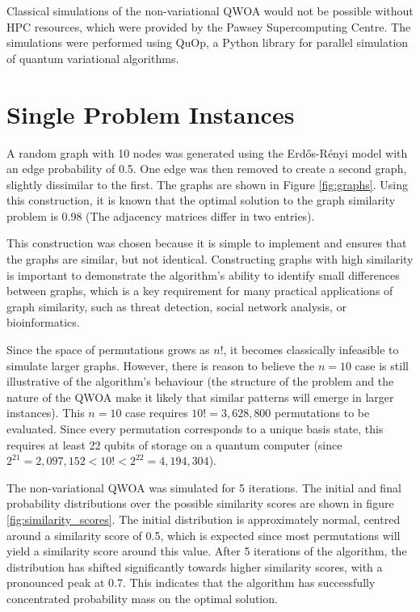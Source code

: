 Classical simulations of the non-variational QWOA would not be possible without HPC resources, which were provided by the Pawsey Supercomputing Centre. The simulations were performed using QuOp, a Python library for parallel simulation of quantum variational algorithms. \cite{QuOp_MPI_paper_variational,QuOp_MPI}

\section{Single Problem Instances}

A random graph with 10 nodes was generated using the Erdős-Rényi model with an edge probability of 0.5. One edge was then removed to create a second graph, slightly dissimilar to the first. The graphs are shown in Figure \ref{fig:graphs}. Using this construction, it is known that the optimal solution to the graph similarity problem is 0.98 (The adjacency matrices differ in two entries).

This construction was chosen because it is simple to implement and ensures that the graphs are similar, but not identical. Constructing graphs with high similarity is important to demonstrate the algorithm's ability to identify small differences between graphs, which is a key requirement for many practical applications of graph similarity, such as threat detection, social network analysis, or bioinformatics.

Since the space of permutations grows as $n!$, it becomes classically infeasible to simulate larger graphs. However, there is reason to believe the $n=10$ case is still illustrative of the algorithm's behaviour (the structure of the problem and the nature of the QWOA make it likely that similar patterns will emerge in larger instances). This $n=10$ case requires $10!=3,628,800$ permutations to be evaluated. Since every permutation corresponds to a unique basis state, this requires at least 22 qubits of storage on a quantum computer (since $2^{21} = 2,097,152 < 10! < 2^{22} = 4,194,304$).

The non-variational QWOA was simulated for 5 iterations. The initial and final probability distributions over the possible similarity scores are shown in figure \ref{fig:similarity_scores}. The initial distribution is approximately normal, centred around a similarity score of 0.5, which is expected since most permutations will yield a similarity score around this value. After 5 iterations of the algorithm, the distribution has shifted significantly towards higher similarity scores, with a pronounced peak at 0.7. This indicates that the algorithm has successfully concentrated probability mass on the optimal solution.

